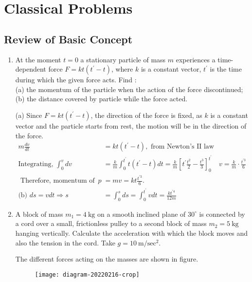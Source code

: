 \chapter{Classical Problems}
\section{Review of Basic Concept}
\begin{enumerate}
	\item At the moment $t=0$ a stationary particle of mass $m$ experiences a time-dependent force $F=k t\left(t^{\prime}-t\right)$, where $k$ is a constant vector, $t^{\prime}$ is the time during which the given force acts. Find :\\
	(a) the momentum of the particle when the action of the force discontinued;\\
	(b) the distance covered by particle while the force acted.
	\begin{answer}
	(a) Since $F=k t\left(t^{\prime}-t\right)$, the direction of the force is fixed, as $k$ is a constant vector and the particle starts from rest, the motion will be in the direction of the force.
	\begin{align*}
	m \frac{d v}{d t}&=k t\left(t^{\prime}-t\right),\text{ from Newton's II law}\\
	\text{Integrating, }\int_{0}^{v} d v&=\frac{k}{m} \int_{0}^{t^{\prime}} t\left(t^{\prime}-t\right) d t=\frac{k}{m}\left[t^{\prime} \frac{t^{2}}{2}-\frac{t^{3}}{3}\right]_{0}^{t^{\prime}} \quad v=\frac{k}{m} \cdot \frac{t^{\prime 3}}{6}\\
\text{	Therefore, momentum of the particle }p&=m v=k t \frac{t^{\prime 3}}{6}.\\
\text{(b) }d s=v d t \Rightarrow s&=\int_{0}^{s} d s=\int_{0}^{t^{\prime}} v d t=\frac{k t^{\prime 4}}{12 m}
	\end{align*}
		\end{answer}
	\item A block of mass $m_{1}=4 \mathrm{~kg}$ on a smooth inclined plane of $30^{\circ}$ is connected by a cord over a small, frictionless pulley to a second block of mass $m_{2}=5 \mathrm{~kg}$ hanging vertically. Calculate the acceleration with which the block moves and also the tension in the cord. Take $g=10 \mathrm{~m} / \mathrm{sec}^{2}$.
	\begin{answer}
			The different forces acting on the masses are shown in figure.
			\begin{figure}[H]
				\centering
				\texttt{[image: diagram-20220216-crop]}

\end{figure}
\end{answer}
\end{enumerate}
